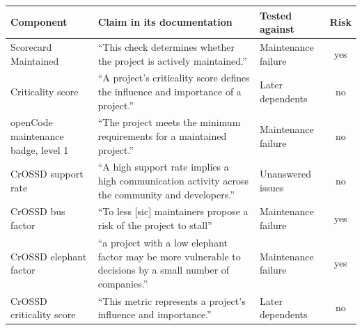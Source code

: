 \begin{tabular}{>{\raggedright\arraybackslash}p{3cm}>{\raggedright\arraybackslash}p{7.4cm}>{\raggedright\arraybackslash}p{3cm}c}
\toprule
Component & Claim in its documentation & Tested against & Risk \\
\midrule
Scorecard Maintained & ``This check determines whether the project is actively maintained.'' & Maintenance failure & yes \\
Criticality score & ``A project's criticality score defines the influence and importance of a project.'' & Later dependents & no \\
openCode maintenance badge, level 1 & ``The project meets the minimum requirements for a maintained project.'' & Maintenance failure & no \\
CrOSSD support rate & ``A high support rate implies a high communication activity across the community and developers.'' & Unanswered issues & no \\
CrOSSD bus factor & ``To less [sic] maintainers propose a risk of the project to stall'' & Maintenance failure & yes \\
CrOSSD elephant factor & ``a project with a low elephant factor may be more vulnerable to decisions by a small number of companies.'' & Maintenance failure & yes \\
CrOSSD criticality score & ``This metric represents a project's influence and importance.'' & Later dependents & no \\
\bottomrule
\end{tabular}
